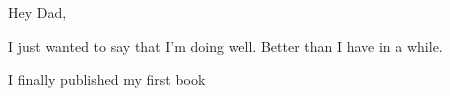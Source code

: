 Hey Dad,

I just wanted to say that I'm doing well. Better than I have in a while.

I finally published my first book
